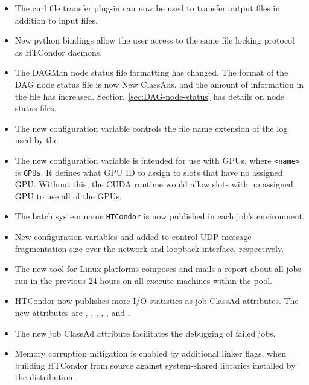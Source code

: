 \begin{itemize}
\item The curl file transfer plug-in can now be used to transfer output
files in addition to input files.

\item New python bindings allow the user access to the same 
file locking protocol as HTCondor daemons.

\item The DAGMan node status file formatting has changed.
The format of the DAG node status file is now New ClassAds,
and the amount of information in the file has increased.
Section~\ref{sec:DAG-node-status} has details on node status files.

\item The new configuration variable 
controls the file name extension of the log used by the .

\item The new configuration variable
is intended for use with GPUs, where \texttt{<name>} is \texttt{GPUs}. 
It defines what GPU ID to assign to slots that have no assigned GPU.
Without this, the CUDA runtime would allow slots with no assigned GPU to use
all of the GPUs.

\item The batch system name \texttt{HTCondor} is now published in 
each job's environment.

\item New configuration variables  and
	 added to control UDP message
	fragmentation size over the network and loopback interface, 
	respectively.

\item The new  tool for Linux platforms
composes and mails a report about all jobs run in the previous
24 hours on all execute machines within the pool. 

\item HTCondor now publishes more I/O statistics as job ClassAd attributes.
The new attributes are
,
,
,
,
, and
.

\item The new job ClassAd attribute  facilitates
the debugging of failed jobs.

\item Memory corruption mitigation is enabled by additional linker flags,
when building HTCondor from source against system-shared
libraries installed by the distribution.

\end{itemize}

